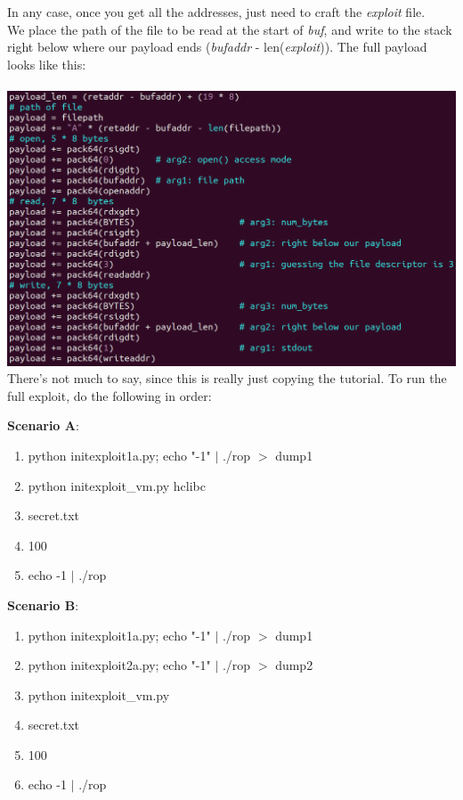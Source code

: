 \documentclass[12pt]{article}
\begin{document}
\newpage

In any case, once you get all the addresses, just need to craft the \emph{exploit} file.\\

We place the path of the file to be read at the start of \emph{buf}, and write to the stack right below where our payload ends (\emph{bufaddr} - len(\emph{exploit})).
The full payload looks like this:\\\\

\includegraphics[scale=0.6]{./a2/rop/exploit.PNG}\\

There's not much to say, since this is really just copying the tutorial.
To run the full exploit, do the following in order:

\newpage

\textbf{Scenario A}:
\begin{enumerate}
    \item python initexploit1a.py; echo "-1" $|$ ./rop $>$ dump1
    \item python initexploit\_vm.py hclibc
    \item secret.txt
    \item 100
    \item echo -1 $|$ ./rop
\end{enumerate}

\textbf{Scenario B}:
\begin{enumerate}
    \item python initexploit1a.py; echo "-1" $|$ ./rop $>$ dump1
    \item python initexploit2a.py; echo "-1" $|$ ./rop $>$ dump2
    \item python initexploit\_vm.py
    \item secret.txt
    \item 100
    \item echo -1 $|$ ./rop
\end{enumerate}
\end{document}
